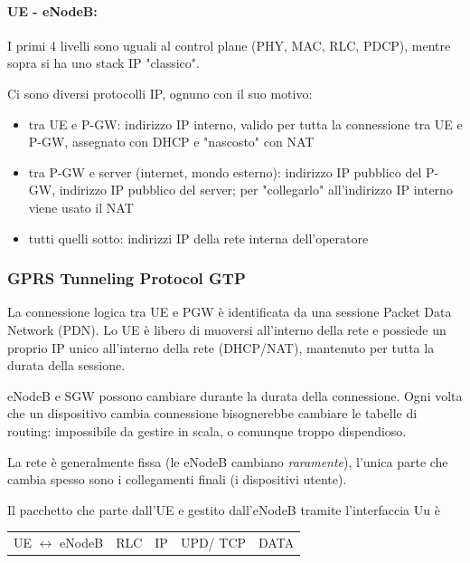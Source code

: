 \paragraph{UE - eNodeB:} I primi 4 livelli sono uguali al control plane (PHY, MAC, RLC, PDCP), mentre sopra si ha uno stack IP "classico".

Ci sono diversi protocolli IP, ognuno con il suo motivo: 
\begin{itemize}
	\item tra UE e P-GW: indirizzo IP interno, valido per tutta la connessione tra UE e P-GW, assegnato con DHCP e "nascosto" con NAT
	
    \item tra P-GW e server (internet, mondo esterno): indirizzo IP pubblico del P-GW, indirizzo IP pubblico del server; per "collegarlo" all'indirizzo IP interno viene usato il NAT
	
    \item tutti quelli sotto: indirizzi IP della rete interna dell'operatore
\end{itemize}

\subsubsection{GPRS Tunneling Protocol GTP} 

La connessione logica tra UE e PGW è identificata da una sessione Packet Data Network (PDN).  Lo UE è libero di muoversi all'interno della rete e possiede un proprio IP unico all'interno della rete (DHCP/NAT), mantenuto per tutta la durata della sessione. 

eNodeB e SGW possono cambiare durante la durata della connessione. Ogni volta che un dispositivo cambia connessione bisognerebbe cambiare le tabelle di routing:  impossibile da gestire in scala, o comunque troppo dispendioso. 

La rete è generalmente fissa (le eNodeB cambiano \textit{raramente}), l'unica parte che cambia spesso sono i collegamenti finali (i dispositivi utente).

Il pacchetto che parte dall'UE e gestito dall'eNodeB tramite l'interfaccia Uu è 
\begin{center}
	\begin{tabular}{l | C{1cm} | C{1cm} | C{1cm} | C{1cm} |}
		UE $\leftrightarrow$ eNodeB & RLC & IP & UPD/ TCP & DATA \\
	\end{tabular}
\end{center}

